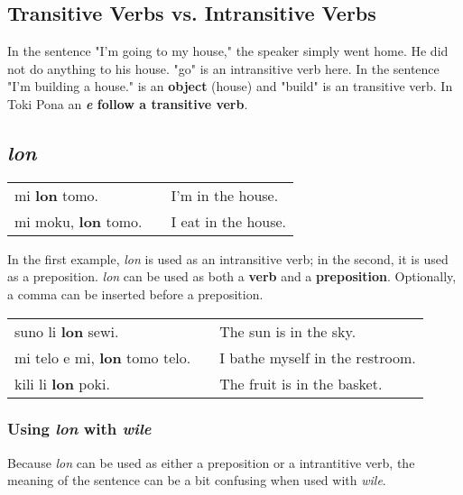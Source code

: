 \subsection*{Transitive Verbs vs. Intransitive Verbs}
%
In the sentence "I'm going to my house," the speaker simply went home.
He did not do anything to his house. 
"go" is an intransitive verb here.
In the sentence "I'm building a house." is an \textbf{object} (house) and "build" is an transitive verb.
In Toki Pona an \textbf{\textit{e} follow a transitive verb}. 
%
\subsection*{\textit{lon}}
%
\begin{supertabular}{p{5,5cm}|ll}
mi \textbf{lon} tomo. && I'm in the house. \\
mi moku, \textbf{lon} tomo. && I eat in the house. \\
\end{supertabular} 

In the first example, \textit{lon} is used as an intransitive verb; in the second, it is used as a preposition. 
\textit{lon} can be used as both a \textbf{verb} and a \textbf{preposition}. 
Optionally, a comma can be inserted before a preposition.

\begin{supertabular}{p{5,5cm}|ll}
suno li \textbf{lon} sewi. && The sun is in the sky. \\
mi telo e mi, \textbf{lon} tomo telo. && I bathe myself in the restroom. \\
kili li \textbf{lon} poki. && The fruit is in the basket. \\
\end{supertabular} 
%
\subsubsection*{Using \textit{lon} with \textit{wile}}
%
Because \textit{lon} can be used as either a preposition or a intrantitive verb, the meaning of the sentence can be a bit confusing when used with \textit{wile}. 

